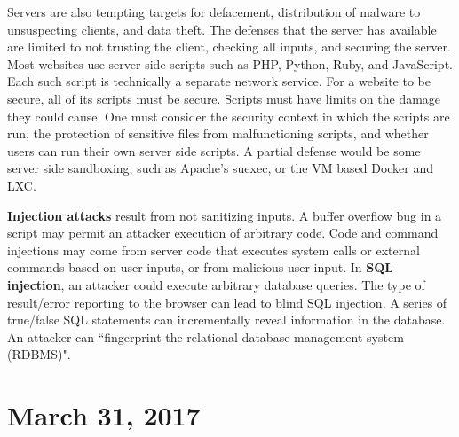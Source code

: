 \documentclass[11pt]{article}
\theoremstyle{plain} %
\theoremstyle{definition}
\theoremstyle{example}
\theoremstyle{remark}
\begin{document}
Servers are also tempting targets for defacement, distribution of malware to unsuspecting clients, and data theft. The defenses that the server has available are limited to not trusting the client, checking all inputs, and securing the server. Most websites use server-side scripts such as PHP, Python, Ruby, and JavaScript. Each such script is technically a separate network service. For a website to be secure, all of its scripts must be secure. Scripts must have limits on the damage they could cause. One must consider the security context in which the scripts are run, the protection of sensitive files from malfunctioning scripts, and whether users can run their own server side scripts. A partial defense would be some server side sandboxing, such as Apache's suexec, or the VM based Docker and LXC. 

\textbf{Injection attacks} result from not sanitizing inputs. A buffer overflow bug in a script may permit an attacker execution of arbitrary code. Code and command injections may come from server code that executes system calls or external commands based on user inputs, or from malicious user input. In \textbf{SQL injection}, an attacker could execute arbitrary database queries. The type of result/error reporting to the browser can lead to blind SQL injection. A series of true/false SQL statements can incrementally reveal information in the database. An attacker can ``fingerprint the relational database management system (RDBMS)". 


\section{March 31, 2017}
\end{document}
